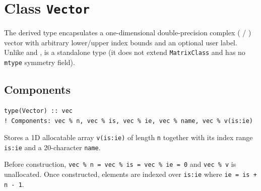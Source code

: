 \section{Class \texttt{Vector}}
\label{sec:class_vector}

The  derived type encapsulates a one-dimensional double-precision complex ( / ) vector with arbitrary lower/upper index bounds and an optional user label. Unlike  and ,  is a standalone type (it does not extend \texttt{MatrixClass} and has no \texttt{mtype} symmetry field).

\subsection{Components}
\label{subsec:vec_components}


\lstset{language=[95]Fortran}
\begin{lstlisting}
type(Vector) :: vec
! Components: vec % n, vec % is, vec % ie, vec % name, vec % v(is:ie)
\end{lstlisting}

Stores a 1D allocatable  array \texttt{v(is:ie)} of length \texttt{n} together with its index range \texttt{is:ie} and a 20-character \texttt{name}.

Before construction, \texttt{vec \% n = vec \% is = vec \% ie = 0} and \texttt{vec \% v} is unallocated. Once constructed, elements are indexed over \texttt{is:ie} where \texttt{ie = is + n - 1}.

\begin{description}[leftmargin=2.2cm, style=nextline]
\end{description}


